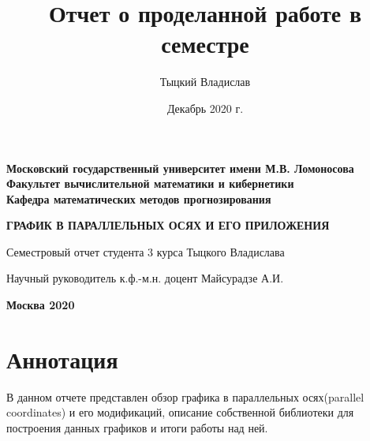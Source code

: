 \documentclass[12pt,fleqn]{article}
\title{Отчет о проделанной работе в семестре}
\author{Тыцкий Владислав}
\date{Декабрь 2020 г.}
\begin{document}
\begin{center}
    \textbf{\Large{Московский государственный университет имени М.В. Ломоносова}} \\
		\vspace{4em}
		\textbf{\Large{Факультет вычислительной математики и кибернетики}} \\
		\vspace{4em}
		\textbf{\Large{Кафедра математических методов прогнозирования}} 
			\vspace{4em}
		
	\end{center}
	

	
	\vspace{12em}
	
	\begin{center}
        \textbf{\LARGE{ГРАФИК В ПАРАЛЛЕЛЬНЫХ ОСЯХ\linebreak \linebreak
         И ЕГО ПРИЛОЖЕНИЯ}}
	\end{center}
	
	\vspace{2em}
	
	\begin{center}
        \large{Семестровый отчет студента 3 курса\linebreak
         Тыцкого Владислава}
	\end{center}
	
	\vspace{6em}
	
	\begin{flushleft}
		
	\large{	Научный руководитель \linebreak
	к.ф.-м.н. доцент Майсурадзе А.И.}\\
		\vspace{1.5em}
	
	
	\end{flushleft}
	
	\vspace{\fill}
	
	\begin{center}
	\textbf{{\large Москва 2020}}
	\end{center}
	\thispagestyle{empty} 
\newpage
\section{Аннотация}
В данном отчете представлен обзор графика в параллельных осях(parallel coordinates)
и его модификаций, описание собственной библиотеки для построения данных графиков и
итоги работы над ней.
\end{document}
